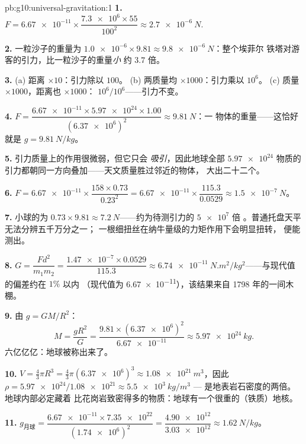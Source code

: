 \begin{solution}{pb:g10:universal-gravitation:1}
\textbf{1.} $F = \num{6.67e-11} \times
\dfrac{\num{7.3e6} \times 55}{100^2} \approx \qty{2.7e-6}{N}$.

\textbf{2.} 一粒沙子的重量为
$\num{1.0e-6} \times 9.81 \approx \qty{9.8e-6}{N}$：整个埃菲尔
铁塔对游客的引力，比一粒沙子的重量\emph{小}
约 $3.7$ 倍。

\textbf{3.} (a) 距离 $\times 10$：引力除以 $100$。
(b) 两质量均 $\times 1000$：引力乘以 $10^6$。
(c) 质量 $\times 1000$，距离也 $\times 1000$：
$10^6 / 10^6$——引力不变。

\textbf{4.} $F = \dfrac{\num{6.67e-11} \times \num{5.97e24} \times
1.00}{(\num{6.37e6})^2} \approx \qty{9.81}{N}$：一
物体的重量——这恰好就是
 $g = \qty{9.81}{N/kg}$。

\textbf{5.} 引力质量上的作用很微弱，但它只会
\emph{吸引}，因此地球全部 $\num{5.97e24}$ 物质的
引力都朝同一方向叠加——天文质量胜过邻近的物体，
大出二十二个。

\textbf{6.} $F = \num{6.67e-11} \times \dfrac{158 \times 0.73}{0.23^2}
= \num{6.67e-11} \times \dfrac{115.3}{0.0529}
\approx \qty{1.5e-7}{N}$。

\textbf{7.} 小球的为
$0.73 \times 9.81 \approx \qty{7.2}{N}$——约为待测引力的 $\num{5e7}$ 倍
。普通托盘天平无法分辨五千万分之一；
一根细扭丝在纳牛量级的力矩作用下会明显扭转，
便能测出。

\textbf{8.} $G = \dfrac{F d^2}{m_1 m_2}
= \dfrac{\num{1.47e-7} \times 0.0529}{115.3}
\approx \qty{6.74e-11}{N.m^2/kg^2}$——与现代值的偏差约在 $1\%$ 以内
（现代值为 \num{6.67e-11}），该结果来自 1798 年的一间木棚。

\textbf{9.} 由 $g = G M / R^2$：
\[
M = \frac{g R^2}{G}
= \frac{9.81 \times (\num{6.37e6})^2}{\num{6.67e-11}}
\approx \qty{5.97e24}{kg}.
\]
六亿亿亿：地球被称出来了。

\textbf{10.} $V = \frac43 \pi R^3 = \frac43 \pi
(\num{6.37e6})^3 \approx \qty{1.08e21}{m^3}$，因此
$\rho = \num{5.97e24}/\num{1.08e21} \approx \qty{5.5e3}{kg/m^3}$ ---
是地表岩石密度的两倍。地球内部必定藏着
比花岗岩致密得多的物质：地球有一个很重的（铁质）地核。

\textbf{11.} $g_{\text{月球}} = \dfrac{\num{6.67e-11} \times
\num{7.35e22}}{(\num{1.74e6})^2} = \dfrac{\num{4.90e12}}
{\num{3.03e12}} \approx \qty{1.62}{N/kg}$。


\end{solution}
